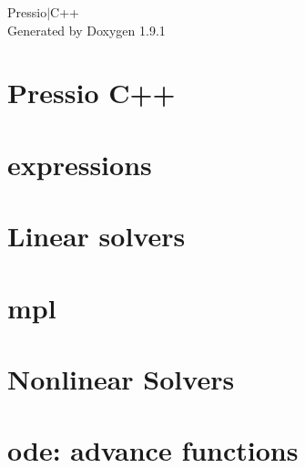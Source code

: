 \let\mypdfximage\pdfximage\def\pdfximage{\immediate\mypdfximage}\documentclass[twoside]{book}
\newcommand{\+}{\discretionary{\mbox{\scriptsize$\hookleftarrow$}}{}{}}
\newcommand{\clearemptydoublepage}{%
  \newpage{\pagestyle{empty}\cleardoublepage}%
}
\begin{document}
\raggedbottom

\hypersetup{pageanchor=false,
             bookmarksnumbered=true,
             pdfencoding=unicode
            }
\begin{titlepage}
\vspace*{7cm}
\begin{center}%
{\Large Pressio$\vert$\+C++ }\\
\vspace*{1cm}
{\large Generated by Doxygen 1.9.1}\\
\end{center}
\end{titlepage}
\clearemptydoublepage
{}
\tableofcontents
\clearemptydoublepage
{}
\hypersetup{pageanchor=true}

\chapter{Pressio C++}
\label{index}\hypertarget{index}{}
\chapter{expressions}
\label{md_pages_components_expressions}

\chapter{Linear solvers}
\label{md_pages_components_linsolvers}

\chapter{mpl}
\label{md_pages_components_mpl}

\chapter{Nonlinear Solvers}
\label{md_pages_components_nonlinsolvers}

\chapter{ode\+: advance functions}
\label{md_pages_components_ode_advance}

\end{document}
